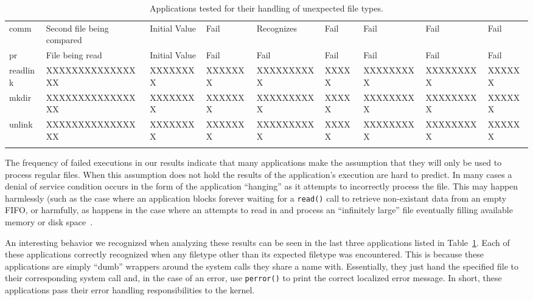 \begin{table}[t]
\begin{tabular}{l  l  |  l  l  l  l  l  l  l}
        comm        & Second file being compared & Initial Value  & Fail           & Recognizes  & Fail       & Fail        & Fail       & Fail\\
        pr          & File being read            & Initial Value  & Fail           & Fail        & Fail       & Fail        & Fail       & Fail\\
        readlink    & XXXXXXXXXXXXXXXX           & XXXXXXXX       & XXXXXXX        & XXXXXXXXXX  & XXXXX      & XXXXXXXXX   & XXXXXXXXX  & XXXXXX\\
        mkdir       & XXXXXXXXXXXXXXXX           & XXXXXXXX       & XXXXXXX        & XXXXXXXXXX  & XXXXX      & XXXXXXXXX   & XXXXXXXXX  & XXXXXX\\
        unlink      & XXXXXXXXXXXXXXXX           & XXXXXXXX       & XXXXXXX        & XXXXXXXXXX  & XXXXX      & XXXXXXXXX   & XXXXXXXXX  & XXXXXX\\
    \bottomrule{}
    \end{tabular}
    \caption{Applications tested for their handling of unexpected file types.
}
    \label{table:unexpectedtypes}
\end{table}

The frequency of failed executions in our results indicate that many
applications make the assumption that they will only be used to process
regular files.  When this assumption does not hold the results of the
application's execution are hard to predict.  In many cases a denial of
service condition occurs in the form of the application ``hanging'' as it
attempts to incorrectly process the file.  This may happen harmlessly (such
as the case where an application blocks forever waiting for a {\tt read()}
call to retrieve non-existant data from an empty FIFO, or harmfully, as
happens in the case where an attempts to read in and process an
``infinitely large'' file eventually filling available memory or disk
space~\cite{Cappos_CCS_08}.  


An interesting behavior we recognized when analyzing these results can be seen
in the last three applications  listed in Table~\ref{table:unexpectedtypes}.  Each of these
applications correctly recognized when any filetype other than its expected
filetype was encountered.  This is because these applications are simply ``dumb'' wrappers
around the system calls they share a name with.  Essentially, they just hand
the specified file to their corresponding system call and, in the case of an
error, use {\tt perror()} to print the correct localized error message.  In
short, these applications pass their error handling responsibilities to the
kernel.

